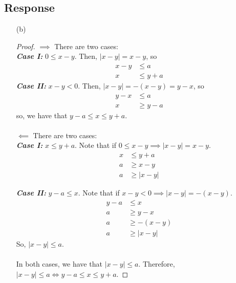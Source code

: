 \message{ !name(Problem_Set_2.tex)}\documentclass[13pt]{article}
\begin{document}
\subsection*{Response}
\begin{enumerate}
\item [(b)]
  \begin{proof}
    $\implies$ There are two cases: \\
    \textit{\textbf{Case I:}} $0 \leq x - y$. Then, $|x - y| = x - y$, so
    \begin{align*}
      x - y &\leq a \\
      x &\leq y + a
    \end{align*}
    \textit{\textbf{Case II:}} $x - y < 0$. Then, $|x - y| = -(x - y) = y - x$, so
    \begin{align*}
      y - x &\leq a \\
      x &\geq y - a
    \end{align*}
    so, we have that $y - a \leq x \leq y + a$. \\ \\
    $\impliedby$ There are two cases: \\
    \textit{\textbf{Case I:}} $x \leq y + a$. Note that if $0 \leq x - y \implies |x - y| = x - y$.
    \begin{align*}
      x &\leq y + a \\
      a &\geq x - y \\
      a &\geq |x - y|
    \end{align*}

    \textit{\textbf{Case II:}} $y - a \leq x$. Note that if $x - y < 0 \implies |x - y| = -(x - y)$.
    \begin{align*}
      y - a &\leq x \\
      a &\geq y - x \\
      a &\geq -(x - y) \\
      a &\geq |x - y|
    \end{align*}
    So, $|x - y| \leq a$. \\ \\
    In both cases, we have that $|x - y| \leq a$. Therefore, $|x - y| \leq a \iff y - a \leq x \leq
    y + a$.
  \end{proof}


\end{enumerate}
\end{document}
